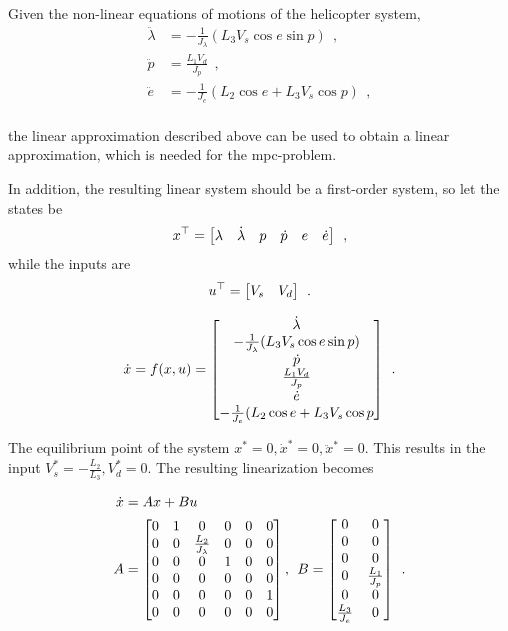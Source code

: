 Given the non-linear equations of motions of the helicopter system,
\begin{equation}
    \begin{split}
        \ddot \lambda &= -\frac{1}{J_{\lambda}}(L_3 V_s \cos e \sin p) \: \: , \\
        \ddot p &= \frac{L_1 V_d}{J_p} \: \: , \\
        \ddot e &= -\frac{1}{J_e}(L_2 \cos e + L_3 V_s \cos p) \: \: ,\\ 
    \end{split}
\end{equation}

the linear approximation described above can be used to obtain a linear approximation, which is needed for the \acrshort{mpc}-problem. 

In addition, the resulting linear system should be a first-order system, so let the states be 
\begin{equation}
    x^\top = \begin{bmatrix}\lambda & \dot \lambda & p & \dot p & e & \dot e\end{bmatrix} \: \: ,
\end{equation}
while the inputs are 
\begin{equation}
    u^\top = \begin{bmatrix}V_s & V_d\end{bmatrix} \: \: .
\end{equation}



\begin{equation}
    \dot x = f(x,u) = \begin{bmatrix}\dot \lambda \\ -\frac{1}{J_{\lambda}}(L_3 V_s \cos e \sin p) \\ \dot p \\ \frac{L_1 V_d}{J_p} \\ \dot e \\ -\frac{1}{J_e}(L_2 \cos e + L_3 V_s \cos p \end{bmatrix} \: \: .
\end{equation}

The equilibrium point of the system $x^* = 0, \dot x^* = 0, \ddot x^* = 0$. This results in the input $V_s^* = -\frac{L_2}{L_3}, V_d^* = 0$. The resulting linearization becomes

\begin{equation}
    \begin{split}
        \dot x &= Ax + Bu \: \:  \\
         A &= \begin{bmatrix}0 & 1 & 0 & 0 & 0 & 0 \\
              0 & 0 & \frac{L_2}{J_{\lambda}} & 0 & 0 & 0 \\
              0 & 0 & 0 & 1 & 0 & 0 \\
              0 & 0 & 0 & 0 & 0 & 0 \\
              0 & 0 & 0 & 0 & 0 & 1 \\
              0 & 0 & 0 & 0 & 0 & 0\end{bmatrix}, \: \: B = \begin{bmatrix}0 & 0 \\
              0 & 0 \\
              0 & 0 \\
              0 & \frac{L_1}{J_p} \\
              0 & 0 \\
              \frac{L_3}{J_e} & 0\end{bmatrix} \: \: .
    \end{split}
\end{equation}

